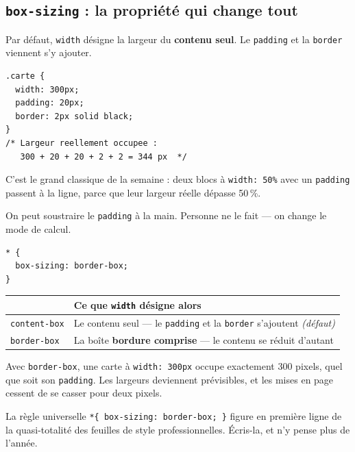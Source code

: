 \documentclass[a4paper,11pt]{article}
\newcommand{\hdr}[1]{\multicolumn{1}{l}{\color{white}\bfseries #1}}
\renewcommand{\arraystretch}{1.3}
\begin{document}
\subsection{\texttt{box-sizing} : la propriété qui change tout}

Par défaut, \texttt{width} désigne la largeur du \textbf{contenu seul}. Le \texttt{padding} et la \texttt{border} viennent s'y ajouter.

\begin{lstlisting}[language=CSS3, caption={Le calcul par défaut, et le piège}]
.carte {
  width: 300px;
  padding: 20px;
  border: 2px solid black;
}
/* Largeur reellement occupee :
   300 + 20 + 20 + 2 + 2 = 344 px  */
\end{lstlisting}

\begin{tcolorbox}[attention, title={Deux cartes de 50\,\% ne tiennent pas côte à côte}]
C'est le grand classique de la semaine : deux blocs à \texttt{width: 50\%} avec un \texttt{padding} passent à la ligne, parce que leur largeur réelle dépasse 50\,\%.

\vspace{3pt}
On peut soustraire le \texttt{padding} à la main. Personne ne le fait --- on change le mode de calcul.
\end{tcolorbox}

\begin{lstlisting}[language=CSS3, caption={La première règle de toute feuille de style}]
* {
  box-sizing: border-box;
}
\end{lstlisting}

\begin{center}
\renewcommand{\arraystretch}{1.0}
\begin{tabularx}{\linewidth}{p{3cm}X}
  \toprule
  \rowcolor{uniNavy}
  \hdr{Valeur} & \hdr{Ce que \texttt{width} désigne alors} \\
  \midrule
  \rowcolor{uniPaper}
  \texttt{content-box} & Le contenu seul --- le \texttt{padding} et la \texttt{border} s'ajoutent \textit{(défaut)} \\
  \texttt{border-box} & La boîte \textbf{bordure comprise} --- le contenu se réduit d'autant \\
  \bottomrule
\end{tabularx}
\end{center}

\begin{tcolorbox}[astuce, title={À écrire en haut de \texttt{style.css}, une fois pour toutes}]
Avec \texttt{border-box}, une carte à \texttt{width: 300px} occupe exactement 300 pixels, quel que soit son \texttt{padding}. Les largeurs deviennent prévisibles, et les mises en page cessent de se casser pour deux pixels.

\vspace{3pt}
La règle universelle \texttt{*\{ box-sizing: border-box; \}} figure en première ligne de la quasi-totalité des feuilles de style professionnelles. Écris-la, et n'y pense plus de l'année.
\end{tcolorbox}
\end{document}
